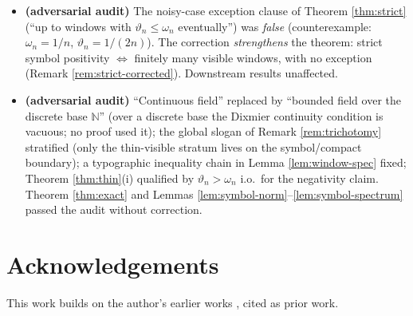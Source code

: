 \documentclass[11pt,reqno]{amsart}
\theoremstyle{definition}
\newcommand{\N}{\mathbb{N}}
\begin{document}
\begin{itemize}
\ref{prop:loc-welldef}); mesh constant corrected to \(b\leq\mu/(4\sqrt2\,L)\)
and ``computable \(N_0\)'' to ``explicit \(N_0\)'' (Theorem \ref{thm:mesh});
the unconditional ``\(\to0\) as \(M\to\infty\)'' claim removed from Lemma
\ref{lem:tail}; the attribution of the global-signature collapse corrected
(Remark \ref{rem:collapse}).
\item \textbf{(adversarial audit)} The noisy-case exception clause of Theorem
\ref{thm:strict} (``up to windows with \(\vartheta_n\leq\omega_n\)
eventually'') was \emph{false} (counterexample: \(\omega_n=1/n\),
\(\vartheta_n=1/(2n)\)). The correction \emph{strengthens} the theorem: strict
symbol positivity \(\iff\) finitely many visible windows, with no exception
(Remark \ref{rem:strict-corrected}). Downstream results unaffected.
\item \textbf{(adversarial audit)} ``Continuous field'' replaced by
``bounded field over the discrete base \(\N\)'' (over a discrete base the
Dixmier continuity condition is vacuous; no proof used it); the global slogan
of Remark \ref{rem:trichotomy} stratified (only the thin-visible stratum lives
on the symbol/compact boundary); a typographic inequality chain in Lemma
\ref{lem:window-spec} fixed; Theorem \ref{thm:thin}(i) qualified by
\(\vartheta_n>\omega_n\) i.o.\ for the negativity claim. Theorem
\ref{thm:exact} and Lemmas \ref{lem:symbol-norm}--\ref{lem:symbol-spectrum}
passed the audit without correction.
\end{itemize}

\section*{Acknowledgements}
This work builds on the author's earlier works \cite{P35,P39,P40}, cited as prior
work.
\end{document}
